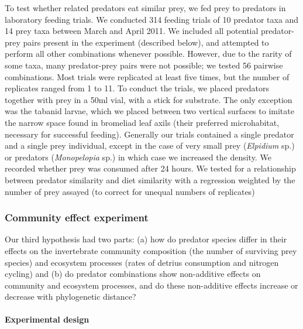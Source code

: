 To test whether related predators eat similar prey, we fed prey to
predators in laboratory feeding trials. We conducted 314 feeding trials
of 10 predator taxa and 14 prey taxa between March and April 2011. We
included all potential predator-prey pairs present in the experiment
(described below), and attempted to perform all other combinations
whenever possible. However, due to the rarity of some taxa, many
predator-prey pairs were not possible; we tested 56 pairwise
combinations. Most trials were replicated at least five times, but the
number of replicates ranged from 1 to 11. To conduct the trials, we
placed predators together with prey in a 50ml vial, with a stick for
substrate. The only exception was the tabanid larvae, which we placed
between two vertical surfaces to imitate the narrow space found in
bromeliad leaf axils (their preferred microhabitat, necessary for
successful feeding). Generally our trials contained a single predator
and a single prey individual, except in the case of very small prey
(\emph{Elpidium} sp.) or predators (\emph{Monopelopia} sp.) in which
case we increased the density. We recorded whether prey was consumed
after 24 hours. We tested for a relationship between predator similarity and diet similarity with a regression weighted by the number of prey assayed (to correct for unequal numbers of replicates)

\subsubsection{Community effect
experiment}\label{community-effect-experiment}

Our third hypothesis had two parts: (a) how do predator species differ
in their effects on the invertebrate community composition (the number of surviving prey species) and ecosystem processes (rates of detrius consumption and nitrogen cycling)
and (b) do predator combinations show non-additive effects on community
and ecosystem processes, and do these non-additive effects increase or
decrease with phylogenetic distance?

\paragraph{Experimental design}\label{experimental-design}

